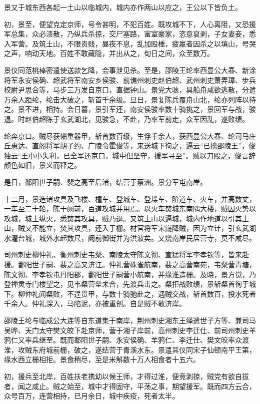 \documentclass[12pt,UTF8]{ctexbook}
\begin{document}
景又于城东西各起一土山以临城内，城内亦作两山以应之，王公以下皆负土。

初，景至，便望克定京师，号令甚明，不犯百姓。既攻城不下，人心离阻，又恐援军总集，众必溃散，乃纵兵杀掠，交尸塞路，富室豪家，恣意裒剥，子女妻妾，悉入军营。及筑土山，不限贵贱，昼夜不息，乱加殴棰，疲羸者因杀之以填山，号哭之声，响动天地。百姓不敢藏隐，并出从之，旬日之间，众至数万。

景仪同范桃棒密遣使送款乞降，会事泄见杀。至是，邵陵王纶率西豊公大春、新涂将军永安侯确、超武将军南安乡侯骏、前谯州刺史赵伯超、武州刺史萧弄璋、步兵校尉尹思合等，马步三万发自京口，直据钟山。景党大骇，具船舟咸欲逃散，分遣万余人距纶，纶击大破之，斩首千余级。旦日，景复陈兵覆舟山北，纶亦列阵以待之。景不进，相持。会日暮，景引军还，南安侯骏率数十骑挑之，景回军与战，骏退。时赵伯超陈于玄武湖北，见骏急，不赴，乃率军前走，众军因乱，遂败绩。

纶奔京口。贼尽获辎重器甲，斩首数百级，生俘千余人，获西豊公大春、纶司马庄丘惠达、直阁将军胡子约、广陵令霍俊等，来送城下徇之，逼云“已擒邵陵王”，俊独云“王小小失利，已全军还京口，城中但坚守，援军寻至”。贼以刀殴之，俊言辞颜色如旧，景义而释之。

是日，鄱阳世子嗣、裴之高至后渚，结营于蔡洲。景分军屯南岸。

十二月，景造诸攻具及飞楼、橦车、登城车、登堞车、阶道车、火车，并高数丈，一车至二十轮，陈于阙前，百道攻城并用焉。以火车焚城东南隅大楼，贼因火势以攻城，城上纵火，悉焚其攻具，贼乃退。又筑土山以逼城，城内作地道以引其土山，贼又不能立，焚其攻具，还入于栅。材官将军宋嶷降贼，因为立计，引玄武湖水灌台城，城外水起数尺，阙前御街并为洪波矣。又烧南岸民居营寺，莫不咸尽。

司州刺史柳仲礼、衡州刺史韦粲、南陵太守陈文彻、宣猛将军李孝钦等，皆来赴援。鄱阳世子嗣、裴之高又济江。仲礼营硃雀航南，裴之高营南苑，韦粲营青塘，陈文彻、李孝钦屯丹阳郡，鄱阳世子嗣营小航南，并缘淮造栅。及晓，景方觉，乃登禅灵寺门楼望之，见韦粲营垒未合，先渡兵击之。粲拒战败绩，景斩粲首徇于城下。柳仲礼闻粲败，不遑贯甲，与数十骑驰赴之，遇贼交战，斩首数百，投水死者千余人。仲礼深入，马陷泥，亦被重创。自是贼不敢济岸。

邵陵王纶与临成公大连等自东道集于南岸，荆州刺史湘东王绎遣世子方等、兼司马吴晔、天门太守樊文皎下赴京师，营于湘子岸前，高州刺史李迁仕、前司州刺史羊鸦仁又率兵继至。既而鄱阳世子嗣、永安侯确、羊鸦仁、李迁仕、樊文皎率众渡淮，攻贼东府城前栅，破之，遂结营于青溪水东。景遣其仪同宋子仙顿南平王第，缘水西立栅相拒。景食稍尽，至是米斛数十万人相食者十五六。

初，援兵至北岸，百姓扶老携幼以候王师，才得过淮，便竞剥掠，贼党有欲自拔者，闻之咸止。贼之始至，城中才得固守，平荡之事，期望援军。既而四方云合，众号百万，连营相持，已月余日，城中疾疫，死者太半。
\end{document}

